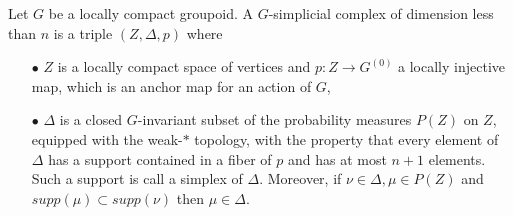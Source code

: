 \begin{definition}
Let $G$ be a locally compact groupoid. A $G$-simplicial complex of dimension less than $n$ is a triple $(Z,\Delta, p)$ where
\begin{itemize}
\item[$\bullet$] $Z$ is a locally compact space of vertices and $p: Z \rightarrow G^{(0)}$ a locally injective map, which is an anchor map for an action of $G$, 
\item[$\bullet$] $\Delta$ is a closed $G$-invariant subset of the probability measures $P(Z)$ on $Z$, equipped with the weak-$*$ topology, with the property that every element of $\Delta$ has a support contained in a fiber of $p$ and has at most $n+1$ elements. Such a support is call a simplex of $\Delta$. Moreover, if $\nu\in \Delta,\mu \in P(Z)$ and $supp(\mu)\subset supp(\nu)$ then $\mu\in \Delta$.
\end{itemize}
\end{definition}































 


